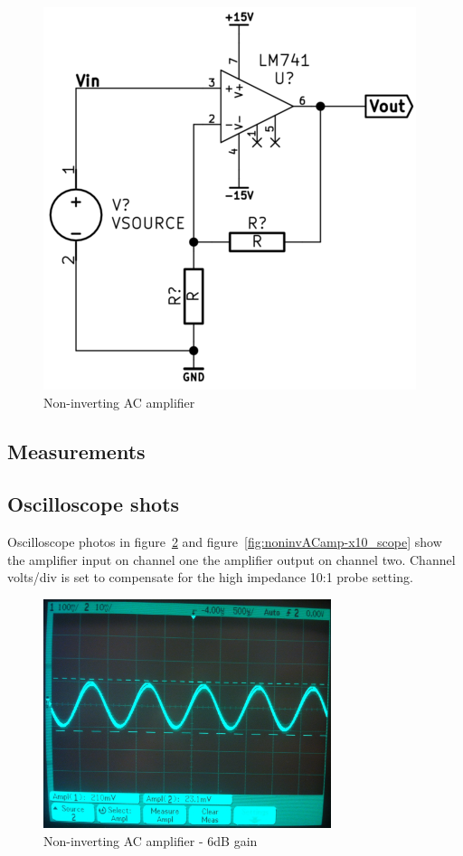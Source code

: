 \documentclass[11pt,a4paper]{article}
\begin{document}
\begin{figure}[htbp]
    \centering
    \includegraphics[scale=0.5]{img/noninvACamp.png}
    \caption{Non-inverting AC amplifier}
    \label{fig:noninvACamp}
\end{figure}


\subsection{Measurements}\label{measurements-3}



\subsection{Oscilloscope shots}\label{noninvAC-oscilloscope-shots}
Oscilloscope photos in figure~\ref{fig:noninvACamp-x1_scope} and
figure~\ref{fig:noninvACamp-x10_scope} show the amplifier input on channel one
the amplifier output on channel two.  Channel volts/div is set to compensate
for the high impedance 10:1 probe setting. 

\begin{figure}[htbp]
    \centering
    \includegraphics[width=0.75\textwidth]{img/noninvACamp-x1.jpg}
    \caption{Non-inverting AC amplifier - 6dB gain}
    \label{fig:noninvACamp-x1_scope}
\end{figure}
\end{document}
